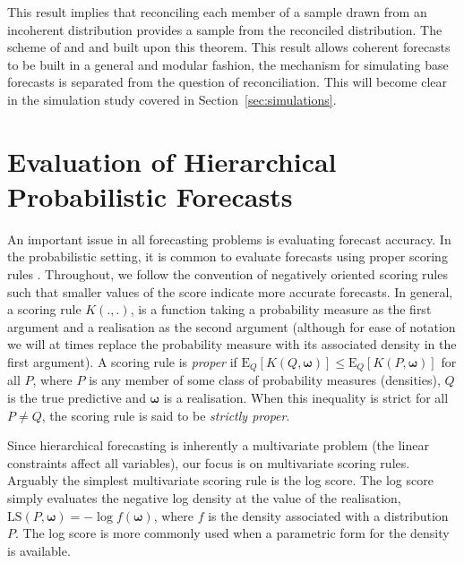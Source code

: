 \documentclass[a4paper,12pt]{article}
\def\E{\text{E}}
\theoremstyle{definition}
\begin{document}
This result implies that reconciling each member of a sample drawn from an incoherent distribution provides a sample from the reconciled distribution. The scheme of \cite{JeoEtAl2019} and \cite{RanEtAl2021} and built upon this theorem. This result allows coherent forecasts to be built in a general and modular fashion, the mechanism for simulating base forecasts is separated from the question of reconciliation. This will become clear in the simulation study covered in Section~\ref{sec:simulations}.


\section{Evaluation of Hierarchical Probabilistic Forecasts} \label{sec:evaluation}

An important issue in all forecasting problems is evaluating forecast accuracy. In the probabilistic setting, it is common to evaluate forecasts using proper scoring rules \citep[see][and references therein]{Gneiting2007,Gneiting2014}. Throughout, we follow the convention of negatively oriented scoring rules such that smaller values of the score indicate more accurate forecasts. In general, a scoring rule $K(.,.)$, is a function taking a probability measure as the first argument and a realisation as the second argument (although for ease of notation we will at times replace the probability measure with its associated density in the first argument). A scoring rule is \emph{proper} if $\E_{Q}[K(Q,\bm{\omega})] \le \E_{Q}[K(P,{\bm\omega})]$ for all $P$, where $P$ is any member of some class of probability measures (densities), $Q$ is the true predictive and $\bm{\omega}$ is a realisation. When this inequality is strict for all $P\neq Q$, the scoring rule is said to be \emph{strictly proper}.

Since hierarchical forecasting is inherently a multivariate problem (the linear constraints affect all variables), our focus is on multivariate scoring rules. Arguably the simplest multivariate scoring rule is the log score. The log score simply evaluates the negative log density at the value of the realisation, $\text{LS}(P,\bm\omega)=-\log f(\bm\omega)$, where $f$ is the density associated with a distribution $P$. The log score is more commonly used when a parametric form for the density is available.
\end{document}
